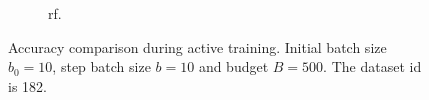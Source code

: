 \documentclass[twoside]{article}
\theoremstyle{definition}
\theoremstyle{remark}
\begin{document}
\begin{figure}[h]
\begin{subfigure}[c]{0.49\linewidth}
            \caption{rf.}
    \end{subfigure}
    \caption{Accuracy comparison during active training. Initial batch size $b_0=10$, step batch size $b=10$ and budget $B=500$. The dataset id is 182.}
    \label{fig:tab_data_id182_imbalanced_app}
\end{figure}
\end{document}
